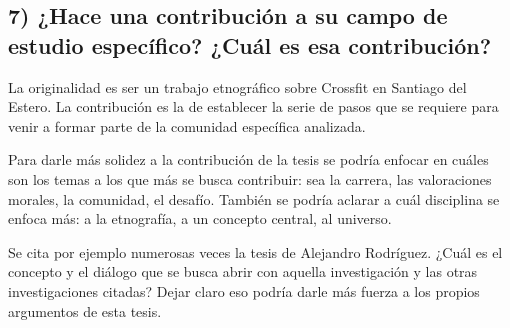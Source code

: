 \subsection*{7) ¿Hace una contribución a su campo de estudio específico?
¿Cuál es esa contribución?}\label{hace-una-contribuciuxf3n-a-su-campo-de-estudio-especuxedfico-cuuxe1l-es-esa-contribuciuxf3n}

La originalidad %
es ser un trabajo etnográfico sobre Crossfit
en Santiago del Estero.
La contribución es la de establecer la serie de pasos que se requiere para
venir a formar parte de la comunidad específica analizada.

Para darle más solidez a la contribución de la tesis se podría enfocar en cuáles son los temas a los que más se busca contribuir:
sea la carrera, las valoraciones morales, la comunidad, el desafío.
También se podría aclarar a cuál disciplina se enfoca más: a la etnografía, a un concepto central, al universo.

Se cita por ejemplo numerosas veces la tesis de Alejandro Rodríguez. 
¿Cuál es el concepto y el diálogo que se busca abrir con aquella investigación y las otras investigaciones citadas?
Dejar claro eso podría darle más fuerza a los propios argumentos de esta tesis.